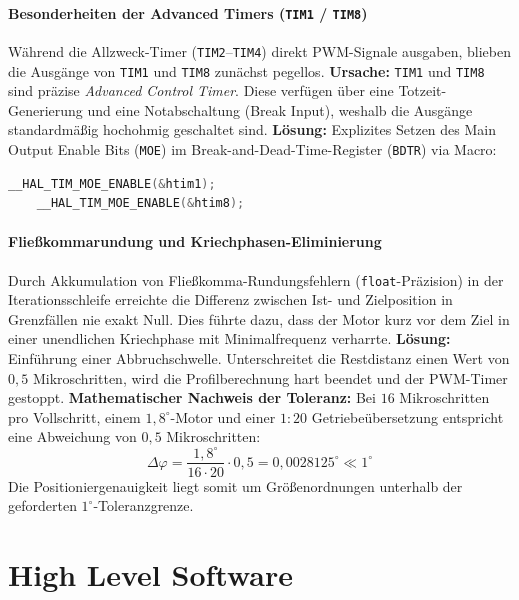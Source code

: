 \subsubsection{Besonderheiten der Advanced Timers (\texttt{TIM1} / \texttt{TIM8})}
Während die Allzweck-Timer (\texttt{TIM2}--\texttt{TIM4}) direkt PWM-Signale ausgaben, blieben die Ausgänge von \texttt{TIM1} und \texttt{TIM8} zunächst pegellos.
\textbf{Ursache:} \texttt{TIM1} und \texttt{TIM8} sind präzise \textit{Advanced Control Timer}. Diese verfügen über eine Totzeit-Generierung und eine Notabschaltung (Break Input), weshalb die Ausgänge standardmäßig hochohmig geschaltet sind.
\textbf{Lösung:} Explizites Setzen des Main Output Enable Bits (\texttt{MOE}) im Break-and-Dead-Time-Register (\texttt{BDTR}) via Macro:
\begin{lstlisting}[language=C, caption={Freischaltung der Advanced Timer Ausgänge}]
	__HAL_TIM_MOE_ENABLE(&htim1);
	__HAL_TIM_MOE_ENABLE(&htim8);
\end{lstlisting}

\subsubsection{Fließkommarundung und Kriechphasen-Eliminierung}
Durch Akkumulation von Fließkomma-Rundungsfehlern (\texttt{float}-Präzision) in der Iterationsschleife erreichte die Differenz zwischen Ist- und Zielposition in Grenzfällen nie exakt Null. Dies führte dazu, dass der Motor kurz vor dem Ziel in einer unendlichen Kriechphase mit Minimalfrequenz verharrte.
\textbf{Lösung:} Einführung einer Abbruchschwelle. Unterschreitet die Restdistanz einen Wert von $0{,}5$ Mikroschritten, wird die Profilberechnung hart beendet und der PWM-Timer gestoppt.
\textbf{Mathematischer Nachweis der Toleranz:} Bei $16$ Mikroschritten pro Vollschritt, einem $1{,}8^\circ$-Motor und einer $1:20$ Getriebeübersetzung entspricht eine Abweichung von $0{,}5$ Mikroschritten:
\begin{equation}
	\Delta\varphi = \frac{1{,}8^\circ}{16 \cdot 20} \cdot 0{,}5 = 0{,}0028125^\circ \ll 1^\circ
\end{equation}
Die Positioniergenauigkeit liegt somit um Größenordnungen unterhalb der geforderten $1^\circ$-Toleranzgrenze.
\chapter{High Level Software}
